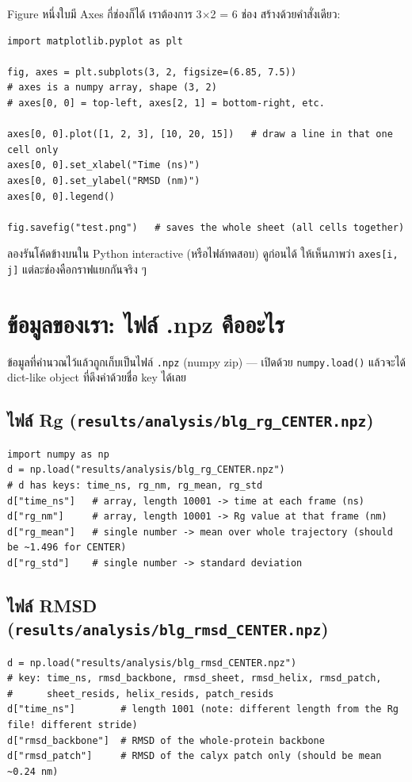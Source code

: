 \documentclass[11pt,a4paper]{article}
\begin{document}
Figure หนึ่งใบมี Axes กี่ช่องก็ได้ เราต้องการ 3$\times$2 = 6 ช่อง สร้างด้วยคำสั่งเดียว:

\begin{lstlisting}
import matplotlib.pyplot as plt

fig, axes = plt.subplots(3, 2, figsize=(6.85, 7.5))
# axes is a numpy array, shape (3, 2)
# axes[0, 0] = top-left, axes[2, 1] = bottom-right, etc.

axes[0, 0].plot([1, 2, 3], [10, 20, 15])   # draw a line in that one cell only
axes[0, 0].set_xlabel("Time (ns)")
axes[0, 0].set_ylabel("RMSD (nm)")
axes[0, 0].legend()

fig.savefig("test.png")   # saves the whole sheet (all cells together)
\end{lstlisting}

ลองรันโค้ดข้างบนใน Python interactive (หรือไฟล์ทดสอบ) ดูก่อนได้ ให้เห็นภาพว่า
\texttt{axes[i, j]} แต่ละช่องคือกราฟแยกกันจริง ๆ

\section{ข้อมูลของเรา: ไฟล์ .npz คืออะไร}
ข้อมูลที่คำนวณไว้แล้วถูกเก็บเป็นไฟล์ \texttt{.npz} (numpy zip) — เปิดด้วย \texttt{numpy.load()}
แล้วจะได้ dict-like object ที่ดึงค่าด้วยชื่อ key ได้เลย

\subsection{ไฟล์ Rg (\texttt{results/analysis/blg\_rg\_CENTER.npz})}
\begin{lstlisting}
import numpy as np
d = np.load("results/analysis/blg_rg_CENTER.npz")
# d has keys: time_ns, rg_nm, rg_mean, rg_std
d["time_ns"]   # array, length 10001 -> time at each frame (ns)
d["rg_nm"]     # array, length 10001 -> Rg value at that frame (nm)
d["rg_mean"]   # single number -> mean over whole trajectory (should be ~1.496 for CENTER)
d["rg_std"]    # single number -> standard deviation
\end{lstlisting}

\subsection{ไฟล์ RMSD (\texttt{results/analysis/blg\_rmsd\_CENTER.npz})}
\begin{lstlisting}
d = np.load("results/analysis/blg_rmsd_CENTER.npz")
# key: time_ns, rmsd_backbone, rmsd_sheet, rmsd_helix, rmsd_patch,
#      sheet_resids, helix_resids, patch_resids
d["time_ns"]        # length 1001 (note: different length from the Rg file! different stride)
d["rmsd_backbone"]  # RMSD of the whole-protein backbone
d["rmsd_patch"]     # RMSD of the calyx patch only (should be mean ~0.24 nm)
\end{lstlisting}
\end{document}
